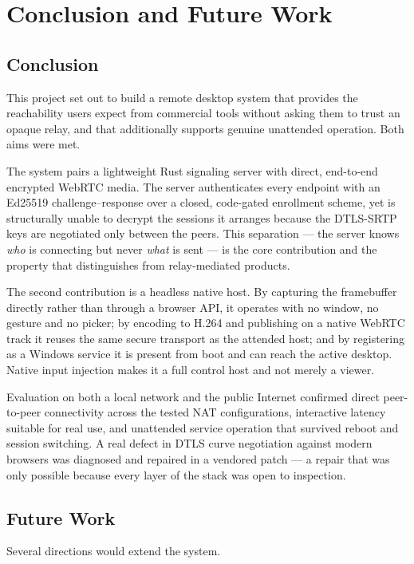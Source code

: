 \chapter{Conclusion and Future Work}

\section{Conclusion}

This project set out to build a remote desktop system that provides the
reachability users expect from commercial tools without asking them to trust an
opaque relay, and that additionally supports genuine unattended operation. Both
aims were met.

The system pairs a lightweight Rust signaling server with direct, end-to-end
encrypted WebRTC media. The server authenticates every endpoint with an Ed25519
challenge--response over a closed, code-gated enrollment scheme, yet is
structurally unable to decrypt the sessions it arranges because the DTLS-SRTP
keys are negotiated only between the peers. This separation --- the server knows
\emph{who} is connecting but never \emph{what} is sent --- is the core
contribution and the property that distinguishes \updesk{} from relay-mediated
products.

The second contribution is a headless native host. By capturing the framebuffer
directly rather than through a browser API, it operates with no window, no
gesture and no picker; by encoding to H.264 and publishing on a native WebRTC
track it reuses the same secure transport as the attended host; and by
registering as a Windows service it is present from boot and can reach the active
desktop. Native input injection makes it a full control host and not merely a
viewer.

Evaluation on both a local network and the public Internet confirmed direct
peer-to-peer connectivity across the tested NAT configurations, interactive
latency suitable for real use, and unattended service operation that survived
reboot and session switching. A real defect in DTLS curve negotiation against
modern browsers was diagnosed and repaired in a vendored patch --- a repair that
was only possible because every layer of the stack was open to inspection.

\section{Future Work}

Several directions would extend the system.

